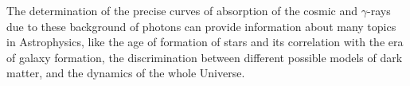 The determination of the precise curves of absorption of the cosmic
and $\gamma$-rays due to these background of photons can provide
information about many topics in Astrophysics, like the age of
formation of stars and its correlation with the era of galaxy
formation, the discrimination between different possible models of
dark matter, and the dynamics of the whole Universe.




\endinput

%

